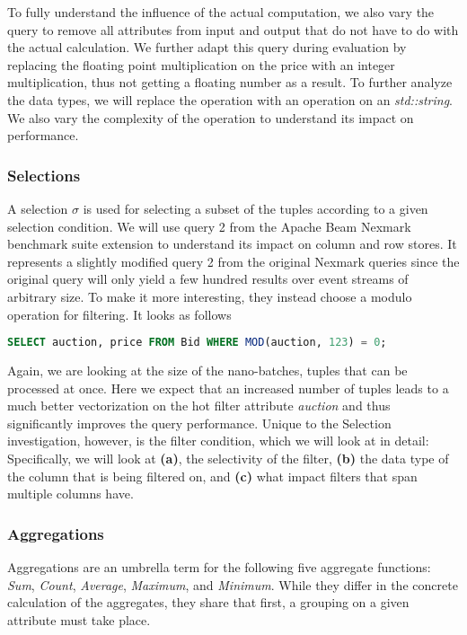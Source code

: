 To fully understand the influence of the actual computation, we also vary the query to remove all attributes from input and output that do not have to do with the actual calculation.
We further adapt this query during evaluation by replacing the floating point multiplication on the price with an integer multiplication, thus not getting a floating number as a result.
To further analyze the data types, we will replace the operation with an operation on an \emph{std::string}.
We also vary the complexity of the operation to understand its impact on performance.

\subsubsection{Selections}

A selection $\sigma$ is used for selecting a subset of the tuples according to a given selection condition.
We will use query 2 from the Apache Beam Nexmark benchmark suite extension to understand its impact on column and row stores. 
It represents a slightly modified query 2 from the original Nexmark queries since the original query will only yield a few hundred results over event streams of arbitrary size.
To make it more interesting, they instead choose a modulo operation for filtering.
It looks as follows
\begin{lstlisting}[language=SQL]
SELECT auction, price FROM Bid WHERE MOD(auction, 123) = 0;
\end{lstlisting}

Again, we are looking at the size of the nano-batches, tuples that can be processed at once.
Here we expect that an increased number of tuples leads to a much better vectorization on the hot filter attribute \emph{auction} and thus significantly improves the query performance.
Unique to the Selection investigation, however, is the filter condition, which we will look at in detail: Specifically, we will look at \textbf{(a)}, the selectivity of the filter, \textbf{(b)} the data type of the column that is being filtered on, and \textbf{(c)} what impact filters that span multiple columns have.

\subsubsection{Aggregations}
Aggregations are an umbrella term for the following five aggregate functions: \emph{Sum}, \emph{Count}, \emph{Average}, \emph{Maximum}, and \emph{Minimum}.
While they differ in the concrete calculation of the aggregates, they share that first, a grouping on a given attribute must take place.

